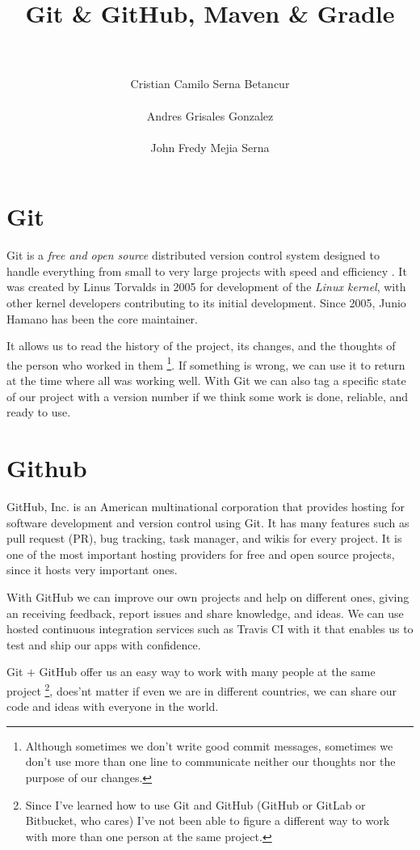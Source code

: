\documentclass[a4paper,11pt]{article}
\title{Git \& GitHub, Maven \& Gradle}
\author{\\\\ Cristian Camilo Serna Betancur \\\\ Andres Grisales Gonzalez  
\\\\ John Fredy Mejia Serna}
\begin{document}
\maketitle
\tableofcontents

\section{Git}
Git is a \emph{free and open source} distributed version control system designed 
to handle everything from small to very large projects with speed and efficiency
\cite{GIT:1}. It was created by Linus Torvalds in 2005 for development of the 
\emph{Linux kernel}, with other kernel developers contributing to its initial 
development. Since 2005, Junio Hamano has been the core maintainer\cite{GIT:2}.

It allows us to read the history of the project, its changes, and the thoughts 
of the person who worked in them \footnote{Although sometimes we don't write 
good commit messages, sometimes we don't use more than one line to communicate 
neither our thoughts nor the purpose of our changes.}. If something is wrong, 
we can use it to return at the time where all was working well. With Git we can 
also tag a specific state of our project with a version number if we think some 
work is done, reliable, and ready to use.

\section{Github}
GitHub, Inc. is an American multinational corporation that provides hosting for 
software development and version control using Git\cite{GITHUB:1}. It has many 
features such as pull request (PR), bug tracking, task manager, and wikis for 
every project. It is one of the most important hosting providers for free and 
open source projects, since it hosts very important ones.

With GitHub we can improve our own projects and help on different ones, giving 
an receiving feedback, report issues and share knowledge, and ideas. We can use
hosted continuous integration services such as Travis CI with it that enables us
to test and ship our apps with confidence\cite{TRAVIS:1}.

Git $+$ GitHub offer us an easy way to work with many people at the same project
\footnote{Since I've learned how to use Git and GitHub (GitHub or GitLab or 
Bitbucket, who cares) I've not been able to figure a different way to work with 
more than one person at the same project.}, does'nt matter if even we are in 
different countries, we can share our code and ideas with everyone in the world.
\end{document}
